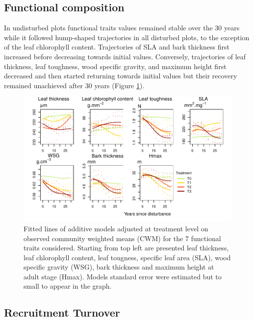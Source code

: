 \documentclass[fleqn,10pt]{ArtEcoFoG} %
\begin{document}
\subsection{Functional composition}\label{functional-composition}

In undisturbed plots functional traits values remained stable over the
30 years while it followed hump-shaped trajectories in all disturbed
plots, to the exception of the leaf chlorophyll content. Trajectories of
SLA and bark thickness first increased before decreasing towards initial
values. Conversely, trajectories of leaf thickness, leaf toughness, wood
specific gravity, and maximum height first decreased and then started
returning towards initial values but their recovery remained unachieved
after 30 years (Figure \ref{fig:CWM}).

\begin{figure}

{\centering \includegraphics{RecruitmentTrajectories_files/figure-latex/CWM-1} 

}

\caption{Fitted lines of additive models adjusted at treatment level on observed community weighted means (CWM) for the 7 functional traits considered. Starting from top left are presented leaf thickness, leaf chlorophyll content, leaf tougness, specific leaf area (SLA), wood specific gravity (WSG), bark thickness and maximum height at adult stage (Hmax). Models standard error were estimated but to small to appear in the graph.}\label{fig:CWM}
\end{figure}

\subsection{Recruitment Turnover}\label{recruitment-turnover}
\end{document}
